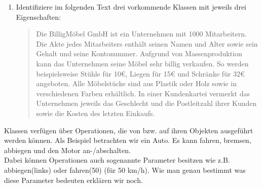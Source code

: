 \begin{enumerate}
    \item Identifiziere im folgenden Text drei vorkommende Klassen mit jeweils drei Eigenschaften:

    \begin{quotation}
        Die BilligMöbel GmbH ist ein Unternehmen mit 1000 Mitarbeitern.
        Die Akte jedes Mitarbeiters enthält seinen Namen und Alter sowie sein Gehalt und seine Kontonummer.
        Aufgrund von Massenproduktion kann das Unternehmen seine Möbel sehr billig verkaufen.
        So werden beispielsweise Stühle für 10€, Liegen für 15€ und Schränke für 32€ angeboten.
        Alle Möbelstücke sind aus Plastik oder Holz sowie in verschiedenen Farben erhältlich.
        In einer Kundenkartei vermerkt das Unternehmen jeweils das Geschlecht und die Postleitzahl ihrer Kunden sowie die Kosten des letzten Einkaufs.
    \end{quotation}
\end{enumerate}

\begin{Infobox}
    Klassen verfügen über Operationen, die von bzw. auf ihren Objekten ausgeführt werden können.
    Als Beispiel betrachten wir ein Auto. Es kann fahren, bremsen, abbiegen und den Motor an-/abschalten.\\

    Dabei können Operationen auch sogenannte Parameter besitzen wie z.B. abbiegen(links) oder fahren(50) (für 50 km/h).
    Wie man genau bestimmt was diese Parameter bedeuten erklären wir noch.
\end{Infobox}

